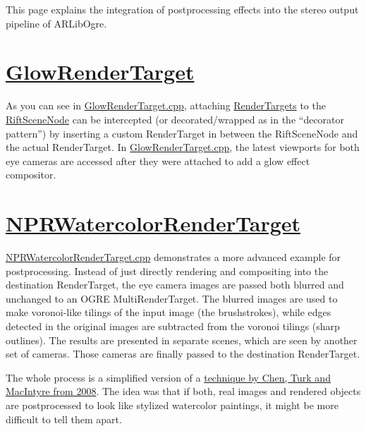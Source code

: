 \documentclass[]{article}
\begin{document}
This page explains the integration of postprocessing effects into the
stereo output pipeline of ARLibOgre.

\section{\texorpdfstring{\href{https://github.com/ands/OculusMeetsAR/blob/master/ARLib_Samples/RemoteGame/src/GlowRenderTarget.cpp}{GlowRenderTarget}}{GlowRenderTarget}}\label{glowrendertarget}

As you can see in
\href{https://github.com/ands/OculusMeetsAR/blob/master/ARLib_Samples/RemoteGame/src/GlowRenderTarget.cpp}{GlowRenderTarget.cpp},
attaching
\href{https://github.com/ands/OculusMeetsAR/wiki/Ogre-Module}{RenderTargets}
to the
\href{https://github.com/ands/OculusMeetsAR/blob/master/ARLib/include/ARLib/Ogre/RiftSceneNode.h}{RiftSceneNode}
can be intercepted (or decorated/wrapped as in the ``decorator
pattern'') by inserting a custom RenderTarget in between the
RiftSceneNode and the actual RenderTarget. In
\href{https://github.com/ands/OculusMeetsAR/blob/master/ARLib_Samples/RemoteGame/src/GlowRenderTarget.cpp}{GlowRenderTarget.cpp},
the latest viewports for both eye cameras are accessed after they were
attached to add a glow effect compositor.

\section{\texorpdfstring{\href{https://github.com/ands/OculusMeetsAR/blob/master/ARLib_Samples/Common/src/NPRWatercolorRenderTarget.cpp}{NPRWatercolorRenderTarget}}{NPRWatercolorRenderTarget}}\label{nprwatercolorrendertarget}

\href{https://github.com/ands/OculusMeetsAR/blob/master/ARLib_Samples/Common/src/NPRWatercolorRenderTarget.cpp}{NPRWatercolorRenderTarget.cpp}
demonstrates a more advanced example for postprocessing. Instead of just
directly rendering and compositing into the destination RenderTarget,
the eye camera images are passed both blurred and unchanged to an OGRE
MultiRenderTarget. The blurred images are used to make voronoi-like
tilings of the input image (the brushstrokes), while edges detected in
the original images are subtracted from the voronoi tilings (sharp
outlines). The results are presented in separate scenes, which are seen
by another set of cameras. Those cameras are finally passed to the
destination RenderTarget.

The whole process is a simplified version of a
\href{http://csnotes.upm.edu.my/kelasmaya/web.nsf/0/d82e709c4661ce464825766400365c4d/\$FILE/p231-chen.pdf}{technique
by Chen, Turk and MacIntyre from 2008}. The idea was that if both, real
images and rendered objects are postprocessed to look like stylized
watercolor paintings, it might be more difficult to tell them apart.
\end{document}

